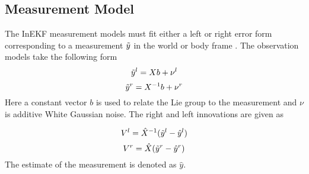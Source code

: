 \subsection{Measurement Model}
The InEKF measurement models must fit either a left or right error form corresponding to a measurement $\Tilde{y}$ in the world or body frame \cite{9444664}. The observation models take the following form
\begin{equation}
    \Tilde{y}^l = X b + \nu^l
    \label{eq: InEKF left observation}
\end{equation}
\begin{equation}
    \Tilde{y}^r = X^{-1} b + \nu^r
    \label{eq: InEKF right observation}
\end{equation}
Here a constant vector $b$ is used to relate the Lie group to the measurement and $\nu$ is additive White Gaussian noise. The right and left innovations are given as

\begin{equation}
    V^l = \hat{X}^{-1} (\Tilde{y}^l - \hat{y}^l)
    \label{eq: InEKF left innovation}
\end{equation}
\begin{equation}
    V^r = \hat{X} (\Tilde{y}^r - \hat{y}^r)
    \label{eq: InEKF right innovation}
\end{equation}
The estimate of the measurement is denoted as $\hat{y}$.

